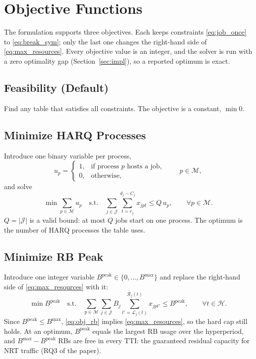 \documentclass[11pt]{article}
\begin{document}

\section{Objective Functions}\label{sec:obj}

The formulation supports three objectives. Each keeps constraints
\eqref{eq:job_once} to \eqref{eq:break_sym}; only the last one changes the
right-hand side of \eqref{eq:max_resources}. Every objective value is an
integer, and the solver is run with a zero optimality gap
(Section~\ref{sec:impl}), so a reported optimum is exact.

\subsection{Feasibility (Default)}\label{sec:obj_feas}

Find any table that satisfies all constraints. The objective is a constant,
$\min 0$.

\subsection{Minimize HARQ Processes}\label{sec:obj_harq}

Introduce one binary variable per process,
\[
u_p =
\begin{cases}
1, & \text{if process }p\text{ hosts a job},\\
0, & \text{otherwise},
\end{cases}
\qquad p \in \mathcal{M},
\]
and solve
\begin{equation}
\min \sum_{p\in\mathcal M} u_p
\quad \text{s.t.} \quad
\sum_{j\in\mathcal J} \sum_{t=r_j}^{d_j-C_j} x_{jpt} \le Q \, u_p,
\qquad \forall p\in\mathcal M.
\label{eq:obj_harq}
\end{equation}
$Q = |\mathcal{J}|$ is a valid bound: at most $Q$ jobs start on one process.
The optimum is the number of HARQ processes the table uses.

\subsection{Minimize RB Peak}\label{sec:obj_rb}

Introduce one integer variable $B^{\mathrm{peak}} \in \{0, \dots, B^{\max}\}$
and replace the right-hand side of \eqref{eq:max_resources} with it:
\begin{equation}
\min B^{\mathrm{peak}}
\quad \text{s.t.} \quad
\sum_{p\in\mathcal M} \sum_{j\in\mathcal J} B_j
\sum_{t'=\mathcal{L}_j(t)}^{\mathcal{R}_j(t)} x_{jpt'}
\le B^{\mathrm{peak}},
\qquad \forall t\in\mathcal H.
\label{eq:obj_rb}
\end{equation}
Since $B^{\mathrm{peak}} \le B^{\max}$, \eqref{eq:obj_rb} implies
\eqref{eq:max_resources}, so the hard cap still holds. At an optimum,
$B^{\mathrm{peak}}$ equals the largest RB usage over the hyperperiod, and
$B^{\max} - B^{\mathrm{peak}}$ RBs are free in every TTI: the guaranteed
residual capacity for NRT traffic (RQ3 of the paper).
\end{document}
